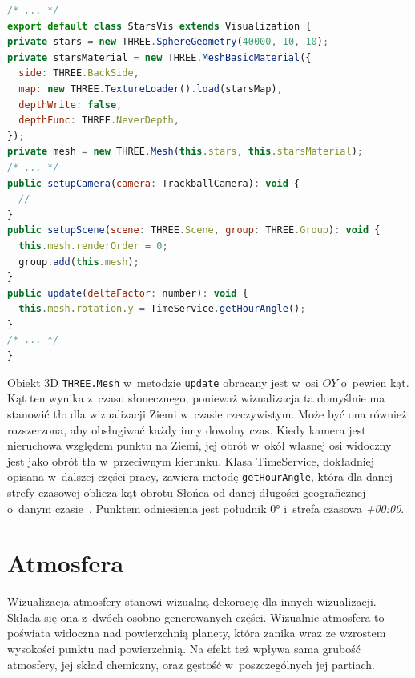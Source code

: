 \begin{lstlisting}[float, language=javascript, label={lst:starsVis}, caption={
  Fragmenty klasy \texttt{StarsVis}}
]
/* ... */
export default class StarsVis extends Visualization {
private stars = new THREE.SphereGeometry(40000, 10, 10);
private starsMaterial = new THREE.MeshBasicMaterial({
  side: THREE.BackSide,
  map: new THREE.TextureLoader().load(starsMap),
  depthWrite: false,
  depthFunc: THREE.NeverDepth,
});
private mesh = new THREE.Mesh(this.stars, this.starsMaterial);
/* ... */
public setupCamera(camera: TrackballCamera): void {
  //
}
public setupScene(scene: THREE.Scene, group: THREE.Group): void {
  this.mesh.renderOrder = 0;
  group.add(this.mesh);
}
public update(deltaFactor: number): void {
  this.mesh.rotation.y = TimeService.getHourAngle();
}
/* ... */
}
\end{lstlisting}

Obiekt 3D \texttt{THREE.Mesh} w~metodzie \texttt{update} obracany jest w~osi $OY$ o~pewien kąt. Kąt ten wynika z~czasu słonecznego, ponieważ wizualizacja ta domyślnie ma stanowić tło dla wizualizacji Ziemi w~czasie rzeczywistym. Może być ona również rozszerzona, aby obsługiwać każdy inny dowolny czas. Kiedy kamera jest nieruchowa względem punktu na Ziemi, jej obrót w~okół własnej osi widoczny jest jako obrót tła w~przeciwnym kierunku. Klasa TimeService, dokładniej opisana w~dalszej części pracy, zawiera metodę \texttt{getHourAngle}, która dla danej strefy czasowej oblicza kąt obrotu Słońca od danej długości geograficznej o~danym czasie~\cite{SolarTime}. Punktem odniesienia jest południk $\ang{0}$ i~strefa czasowa \textit{+00:00}. 

\section{Atmosfera}

Wizualizacja atmosfery stanowi wizualną dekorację dla innych wizualizacji. Składa się ona z~dwóch osobno generowanych części. Wizualnie atmosfera to poświata widoczna nad powierzchnią planety, która zanika wraz ze wzrostem wysokości punktu nad powierzchnią. Na efekt też wpływa sama grubość atmosfery, jej skład chemiczny, oraz gęstość w~poszczególnych jej partiach.

